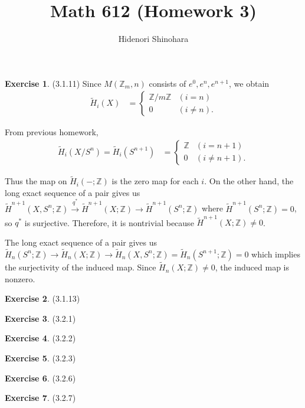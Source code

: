 \documentclass[12pt, psamsfonts]{amsart}
\theoremstyle{definition}
\newtheorem*{exer}{Exercise}
\theoremstyle{remark}
\numberwithin{equation}{section}
\begin{document}
\title{Math 612 (Homework 3)}
\author{Hidenori Shinohara}
\maketitle

\begin{exer}{(3.1.11)}
  Since $M(\mathbb{Z}_m, n)$ consists of $e^0, e^n, e^{n + 1}$, we obtain
  \begin{align*}
    \tilde{H}_i(X) &= \begin{cases}
      \mathbb{Z} / m\mathbb{Z} & (i = n) \\
      0 & (i \ne n).
    \end{cases}
  \end{align*}

  From previous homework,
  \begin{align*}
    \tilde{H}_i(X / S^n) = \tilde{H}_i(S^{n + 1}) &= \begin{cases}
      \mathbb{Z} & (i = n + 1) \\
      0 & (i \ne n + 1).
    \end{cases}
  \end{align*}

  Thus the map on $\tilde{H}_i(-; \mathbb{Z})$ is the zero map for each $i$.
  On the other hand, the long exact sequence of a pair gives us $\tilde{H}^{n + 1}(X, S^n; \mathbb{Z}) \xrightarrow{q^{\ast}} \tilde{H}^{n + 1}(X; \mathbb{Z}) \rightarrow \tilde{H}^{n + 1}(S^n; \mathbb{Z})$ where $\tilde{H}^{n + 1}(S^n; \mathbb{Z}) = 0$, so $q^{\ast}$ is surjective.
  Therefore, it is nontrivial because $\tilde{H}^{n + 1}(X; \mathbb{Z}) \ne 0$.


  The long exact sequence of a pair gives us $\tilde{H}_n(S^n; \mathbb{Z}) \rightarrow \tilde{H}_n(X; \mathbb{Z}) \rightarrow \tilde{H}_n(X, S^n; \mathbb{Z}) = \tilde{H}_n(S^{n + 1}; \mathbb{Z}) = 0$ which implies the surjectivity of the induced map.
  Since $\tilde{H}_n(X; \mathbb{Z}) \ne 0$, the induced map is nonzero.
\end{exer}

\begin{exer}{(3.1.13)}
\end{exer}

\begin{exer}{(3.2.1)}
\end{exer}

\begin{exer}{(3.2.2)}
\end{exer}

\begin{exer}{(3.2.3)}
\end{exer}

\begin{exer}{(3.2.6)}
\end{exer}

\begin{exer}{(3.2.7)}
\end{exer}
\end{document}
